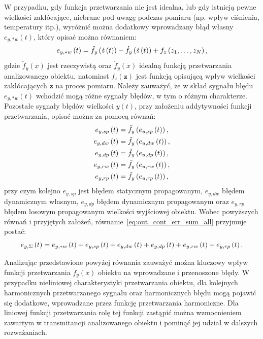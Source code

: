 W przypadku, gdy funkcja przetwarzania nie jest idealna, lub gdy istnieją pewne wielkości zakłócające, niebrane pod uwagę podczas pomiaru (np. wpływ ciśnienia, temperatury itp.), wyróżnić można dodatkowy wprowadzany błąd własny $e_{y,*w}(t)$, który opisać można równaniem:
\begin{equation}
e_{y,*w} \left(t\right) = \tilde{f}_{y} \left( \dot{s} \left(t\right) \right) - \dot{f}_{y} \left( \dot{s} \left(t\right) \right) + f_{z} \left( z_{1}, \hdots, z_{N} \right) \label{eq:out_cont_err_stat_self},
\end{equation}
gdzie $\tilde{f}_{y}(x)$ jest rzeczywistą oraz $\dot{f}_{y}(x)$ idealną funkcją przetwarzania analizowanego obiektu, natomiast $f_{z}(\mathbf{z})$ jest funkcją opisującą wpływ wielkości zakłócających $\mathbf{z}$ na proces pomiaru. Należy zauważyć, że w skład sygnału błędu $e_{y,*w}(t)$ wchodzić mogą różne sygnały błędów, w tym o różnym charakterze. Pozostałe sygnały błędów wielkości $y(t)$, przy założeniu addytywności funkcji przetwarzania, opisać można za pomocą równań:
\begin{gather}
e_{y,sp} \left(t\right) = \tilde{f}_{y} \left( e_{u,sp} \left(t\right) \right) \label{eq:out_cont_err_stat_prop}, \\
e_{y,dw} \left(t\right) = \tilde{f}_{y} \left( e_{u,dw} \left(t\right) \right) \label{eq:out_cont_err_dyn_prop}, \\
e_{y,dp} \left(t\right) = \tilde{f}_{y} \left( e_{u,dp} \left(t\right) \right) \label{eq:out_cont_err_dyn_self}, \\
e_{y,rw} \left(t\right) = \tilde{f}_{y} \left( e_{u,rw} \left(t\right) \right) \label{eq:out_cont_err_rand_self}, \\
e_{y,rp} \left(t\right) = \tilde{f}_{y} \left( e_{u,rp} \left(t\right) \right) \label{eq:out_cont_err_rand_prop},
\end{gather}
przy czym kolejno $e_{y,sp}$ jest błędem statycznym propagowanym, $e_{y,dw}$ błędem dynamicznym własnym, $e_{y,dp}$ błędem dynamicznym propagowanym oraz $e_{y,rp}$ błędem losowym propagowanym wielkości wyjściowej obiektu. Wobec powyższych równań i przyjętych założeń, równanie~\eqref{eq:out_cont_err_sum_all} przyjmuje postać:
\begin{equation}
e_{y,\Sigma} \left(t\right) = e_{y,*w} \left(t\right) + e_{y,sp} \left(t\right) + e_{y,dw} \left(t\right) + e_{y,dp} \left(t\right) + e_{y,rw} \left(t\right) + e_{y,rp} \left(t\right) \label{eq:out_cont_err_sum_add}.
\end{equation}

Analizując przedstawione powyżej równania zauważyć można kluczowy wpływ funkcji przetwarzania $f_{y}(x)$ obiektu na wprowadzane i przenoszone błędy. W przypadku nieliniowej charakterystyki przetwarzania obiektu, dla kolejnych harmonicznych przetwarzanego sygnału oraz harmonicznych błędu mogą pojawić się dodatkowe, wprowadzane przez funkcję przetwarzania harmoniczne. Dla liniowej funkcji przetwarzania rolę tej funkcji zastąpić można wzmocnieniem zawartym w transmitancji analizowanego obiektu i pominąć jej udział w dalszych rozważaniach.

